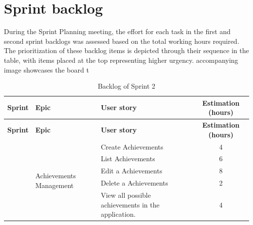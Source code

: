 \section{Sprint backlog}
During the Sprint Planning meeting, the effort for each task in the first and second sprint backlogs was assessed based on the total working hours required. The prioritization of these backlog items is depicted through their sequence in the table, with items placed at the top representing higher urgency.  accompanying image showcases the board t
 \\
\begin{longtable}{ | m{}  | m{} | m{} | c | }
    \caption{Backlog of Sprint 2}                                                                                                          \\
    \hline
    \textbf{Sprint}         & \textbf{Epic}                                        & \textbf{User story}          & \textbf{Estimation (hours)} \\
    \hline
    \endfirsthead
    \hline
    \textbf{Sprint}         & \textbf{Epic}                                        & \textbf{User story}          & \textbf{Estimation (hours)} \\
    \hline
    \endhead
    \hline
    \endfoot
    \endlastfoot
    \multirow[t]{2}{5em}{2} & \multirow{5}{5em}{Achievements Management} & Create Achievements            & 4                          \\
    \cline{3-4}
                            &                                                      & List Achievements               & 6                          \\
    \cline{3-4}
                            &                                                      & Edit a Achievements              & 8                           \\
    \cline{3-4}
                            &                                                      & Delete a Achievements            & 2                           \\
    \cline{3-4}                        &                  & View all possible achievements in the application. & 4                          \\
                    


\end{longtable}

